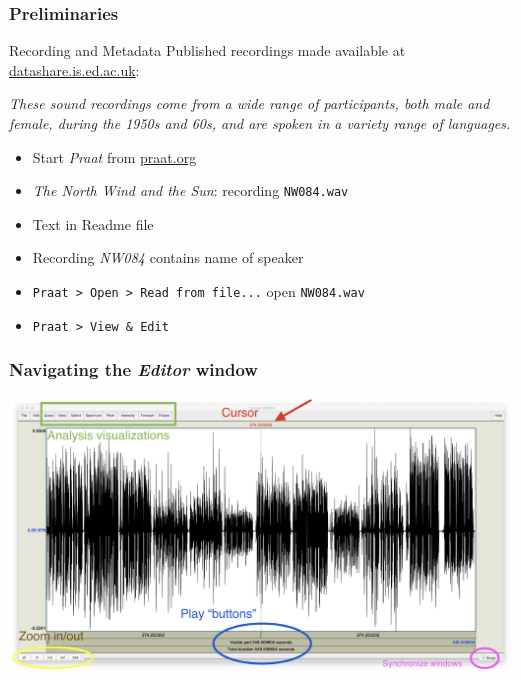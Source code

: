 \documentclass{beamer}
\begin{document}
\begin{frame} 
\frametitle{Preliminaries} 
\begin{block}{Recording and Metadata}
Published recordings made available at \href{https://datashare.is.ed.ac.uk/handle/10283/387}{datashare.is.ed.ac.uk}:

\textit{These sound recordings come from a wide range of participants, both male and female, during the 1950s and 60s, and are spoken in a variety range of languages.}
\end{block} 
\begin{itemize} 
\item Start \textit{Praat} from \href{http://www.praat.org}{praat.org}
\item \textit{The North Wind and the Sun}: recording \texttt{NW084.wav}
\item Text in Readme file
\item Recording \textit{NW084} contains name of speaker
\item \texttt{Praat > Open > Read from file...} open \texttt{NW084.wav}
\item \texttt{Praat > View \& Edit}
\end{itemize}
\end{frame}

\begin{frame} 
\frametitle{Navigating the \textit{Editor} window} 

\includegraphics[width=1\framewidth]{img/Editor_Screenshot}

\end{frame}
\end{document}
